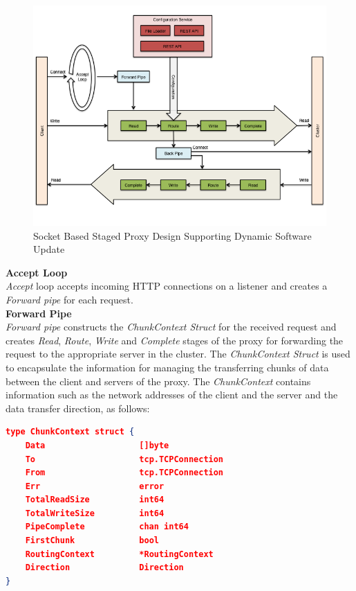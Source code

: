 \documentclass[a4paper,11pt,twoside]{article}
\begin{document}
\begin{figure}[!ht]
  \centering
     \includegraphics[scale=0.60]{proxy}
  \caption{Socket Based Staged Proxy Design Supporting Dynamic Software Update}
  \label{proxy}
\end{figure}

\noindent
\textbf{Accept Loop} \\
 \textit{Accept} loop accepts incoming HTTP connections on a listener and creates a  \textit{Forward pipe} for each request.\\  

\noindent
\textbf{Forward Pipe} \\
\textit{Forward pipe} constructs the \textit{ChunkContext Struct} for the received request and creates \textit{Read}, \textit{Route}, \textit{Write} and \textit{Complete} stages of the proxy for forwarding the request to the appropriate server in the cluster. The \textit{ChunkContext Struct} is used to encapsulate the information for managing the transferring chunks of data between the client and servers of the proxy. The \textit{ChunkContext} contains information such as the network addresses of the client and the server and the data transfer direction, as follows: \\ 

\begin{lstlisting}[language=json,firstnumber=1]
type ChunkContext struct {
	Data                   []byte
	To                     tcp.TCPConnection
	From                   tcp.TCPConnection
	Err                    error
	TotalReadSize          int64
	TotalWriteSize         int64
	PipeComplete           chan int64
	FirstChunk             bool
	RoutingContext         *RoutingContext
	Direction              Direction
}
\end{lstlisting} 
\end{document}
